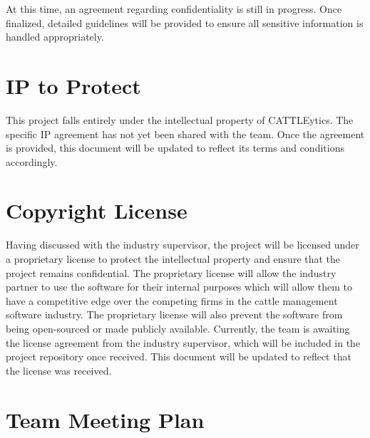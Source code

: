 \documentclass{article}
\begin{document}
At this time, an agreement regarding confidentiality is still in progress. Once
finalized, detailed guidelines will be provided to ensure all sensitive
information is handled appropriately.

\section{IP to Protect}
This project falls entirely under the intellectual property of CATTLEytics. The
specific IP agreement has not yet been shared with the team. Once the agreement
is provided, this document will be updated to reflect its terms and conditions
accordingly.

\section{Copyright License}
Having discussed with the industry supervisor, the project will be licensed
 under a proprietary license to protect the intellectual property and ensure
 that the project remains confidential. The proprietary license will allow the
 industry partner to use the software for their internal purposes which will
 allow them to have a competitive edge over the competing firms in the cattle
 management software industry. The proprietary license will also prevent the
 software from being open-sourced or made publicly available. Currently, the
 team is awaiting the license agreement from the industry supervisor, which will
 be included in the project repository once received. This document will be
 updated to reflect that the license was received.

\section{Team Meeting Plan}
\end{document}
